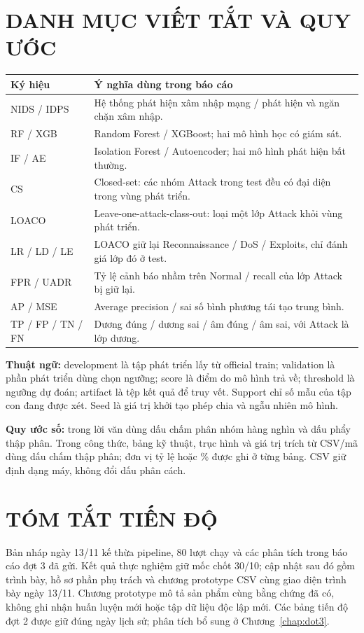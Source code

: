 \documentclass[12pt,a4paper,oneside]{report}
\begin{document}
\chapter*{DANH MỤC VIẾT TẮT VÀ QUY ƯỚC}
\begingroup\small\renewcommand{\arraystretch}{1.2}
\noindent\begin{tabularx}{\textwidth}{L{2.8cm}Y}\toprule
Ký hiệu & Ý nghĩa dùng trong báo cáo\\\midrule
NIDS / IDPS & Hệ thống phát hiện xâm nhập mạng / phát hiện và ngăn chặn xâm nhập.\\
RF / XGB & Random Forest / XGBoost; hai mô hình học có giám sát.\\
IF / AE & Isolation Forest / Autoencoder; hai mô hình phát hiện bất thường.\\
CS & Closed-set: các nhóm Attack trong test đều có đại diện trong vùng phát triển.\\
LOACO & Leave-one-attack-class-out: loại một lớp Attack khỏi vùng phát triển.\\
LR / LD / LE & LOACO giữ lại Reconnaissance / DoS / Exploits, chỉ đánh giá lớp đó ở test.\\
FPR / UADR & Tỷ lệ cảnh báo nhầm trên Normal / recall của lớp Attack bị giữ lại.\\
AP / MSE & Average precision / sai số bình phương tái tạo trung bình.\\
TP / FP / TN / FN & Dương đúng / dương sai / âm đúng / âm sai, với Attack là lớp dương.\\
\bottomrule\end{tabularx}\endgroup

\textbf{Thuật ngữ:} development là tập phát triển lấy từ official train; validation là phần phát triển dùng chọn ngưỡng; score là điểm do mô hình trả về; threshold là ngưỡng dự đoán; artifact là tệp kết quả để truy vết. Support chỉ số mẫu của tập con đang được xét. Seed là giá trị khởi tạo phép chia và ngẫu nhiên mô hình.

\textbf{Quy ước số:} trong lời văn dùng dấu chấm phân nhóm hàng nghìn và dấu phẩy thập phân. Trong công thức, bảng kỹ thuật, trục hình và giá trị trích từ CSV/mã dùng dấu chấm thập phân; đơn vị tỷ lệ hoặc \% được ghi ở từng bảng. CSV giữ định dạng máy, không đổi dấu phân cách.
\clearpage
\chapter*{TÓM TẮT TIẾN ĐỘ}
Bản nháp ngày 13/11 kế thừa pipeline, 80 lượt chạy và các phân tích trong báo cáo đợt 3 đã gửi. Kết quả thực nghiệm giữ mốc chốt 30/10; cập nhật sau đó gồm trình bày, hồ sơ phần phụ trách và chương prototype CSV cùng giao diện trình bày ngày 13/11. Chương prototype mô tả sản phẩm cùng bằng chứng đã có, không ghi nhận huấn luyện mới hoặc tập dữ liệu độc lập mới. Các bảng tiến độ đợt 2 được giữ đúng ngày lịch sử; phân tích bổ sung ở Chương~\ref{chap:dot3}.
\end{document}
